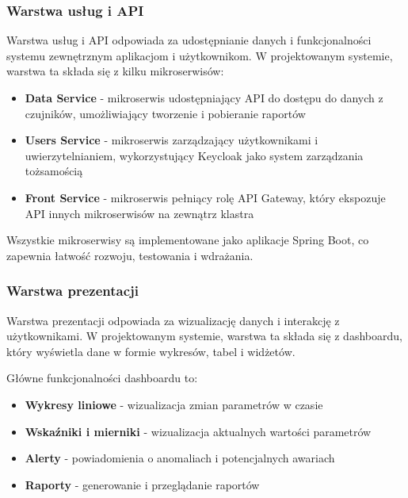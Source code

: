 
\subsubsection{Warstwa usług i API}
\label{subsubsec:warstwa_uslug}

Warstwa usług i API odpowiada za udostępnianie danych i funkcjonalności systemu zewnętrznym aplikacjom i użytkownikom. W projektowanym systemie,
warstwa ta składa się z kilku mikroserwisów:

\begin{itemize}
    \item \textbf{Data Service} - mikroserwis udostępniający API do dostępu do danych z czujników, umożliwiający tworzenie i pobieranie raportów
    \item \textbf{Users Service} - mikroserwis zarządzający użytkownikami i uwierzytelnianiem, wykorzystujący Keycloak jako system zarządzania tożsamością
    \item \textbf{Front Service} - mikroserwis pełniący rolę API Gateway, który ekspozuje API innych mikroserwisów na zewnątrz klastra
\end{itemize}

Wszystkie mikroserwisy są implementowane jako aplikacje Spring Boot, co zapewnia łatwość rozwoju, testowania i wdrażania.

\subsubsection{Warstwa prezentacji}
\label{subsubsec:warstwa_prezentacji}

Warstwa prezentacji odpowiada za wizualizację danych i interakcję z użytkownikami.
W projektowanym systemie, warstwa ta składa się z dashboardu, który wyświetla dane w formie wykresów, tabel i widżetów.

Główne funkcjonalności dashboardu to:

\begin{itemize}
    \item \textbf{Wykresy liniowe} - wizualizacja zmian parametrów w czasie
    \item \textbf{Wskaźniki i mierniki} - wizualizacja aktualnych wartości parametrów
    \item \textbf{Alerty} - powiadomienia o anomaliach i potencjalnych awariach
    \item \textbf{Raporty} - generowanie i przeglądanie raportów
\end{itemize}

